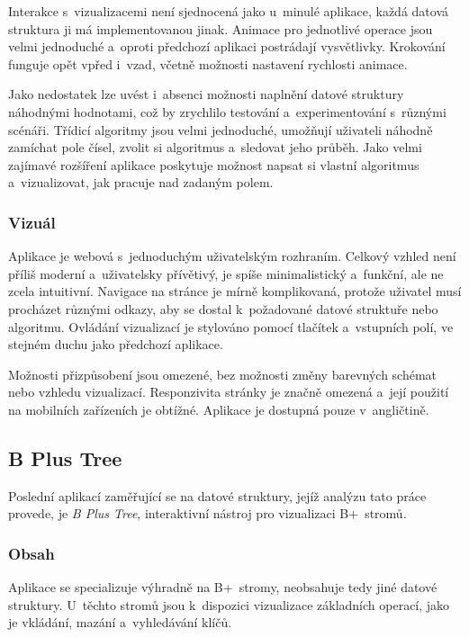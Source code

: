 Interakce s~vizualizacemi není sjednocená jako u~minulé aplikace, každá datová struktura ji má implementovanou jinak.
Animace pro jednotlivé operace jsou velmi jednoduché a~oproti předchozí aplikaci postrádají vysvětlivky.
Krokování funguje opět vpřed i~vzad, včetně možnosti nastavení rychlosti animace.

Jako nedostatek lze uvést i~absenci možnosti naplnění datové struktury náhodnými hodnotami, což by zrychlilo testování a~experimentování s~různými scénáři.
Třídicí algoritmy jsou velmi jednoduché, umožňují uživateli náhodně zamíchat pole čísel, zvolit si algoritmus a~sledovat jeho průběh.
Jako velmi zajímavé rozšíření aplikace poskytuje možnost napsat si vlastní algoritmus a~vizualizovat, jak pracuje nad zadaným polem.

\pagebreak
\subsubsection*{Vizuál}

Aplikace je webová s~jednoduchým uživatelským rozhraním.
Celkový vzhled není příliš moderní a~uživatelsky přívětivý, je spíše minimalistický a~funkční, ale ne zcela intuitivní.
Navigace na stránce je mírně komplikovaná, protože uživatel musí procházet různými odkazy, aby se dostal k~požadované datové struktuře nebo algoritmu.
Ovládání vizualizací je stylováno pomocí tlačítek a~vstupních polí, ve stejném duchu jako předchozí aplikace.

Možnosti přizpůsobení jsou omezené, bez možnosti změny barevných schémat nebo vzhledu vizualizací.
Responzivita stránky je značně omezená a~její použití na mobilních zařízeních je obtížné.
Aplikace je dostupná pouze v~angličtině.

\subsection{B Plus Tree}
\label{subsec:other_apps_ds_b_plus_tree}

Poslední aplikací zaměřující se na datové struktury, jejíž analýzu tato práce provede, je \textit{B Plus Tree}, interaktivní nástroj pro vizualizaci B+~stromů.~\cite{bPlusTree}

\subsubsection*{Obsah}

Aplikace se specializuje výhradně na B+~stromy, neobsahuje tedy jiné datové struktury.
U~těchto stromů jsou k~dispozici vizualizace základních operací, jako je vkládání, mazání a~vyhledávání klíčů.


